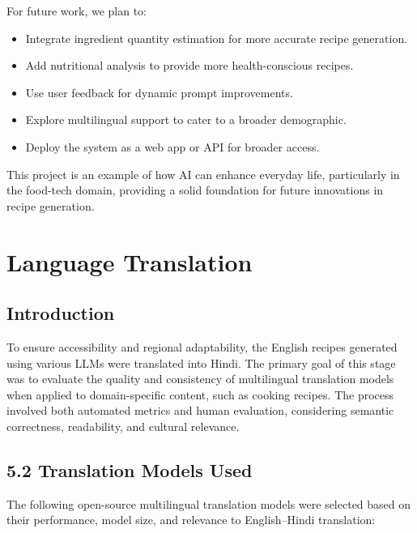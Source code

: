 \documentclass[letterpaper,11pt]{report}
\begin{document}
For future work, we plan to:
\begin{itemize}
    \item Integrate ingredient quantity estimation for more accurate recipe generation.
    \item Add nutritional analysis to provide more health-conscious recipes.
    \item Use user feedback for dynamic prompt improvements.
    \item Explore multilingual support to cater to a broader demographic.
    \item Deploy the system as a web app or API for broader access.
\end{itemize}

This project is an example of how AI can enhance everyday life, particularly in the food-tech domain, providing a solid foundation for future innovations in recipe generation.


\chapter{Language Translation}
\section{Introduction}
To ensure accessibility and regional adaptability, the English recipes generated using various LLMs were translated into Hindi. The primary goal of this stage was to evaluate the quality and consistency of multilingual translation models when applied to domain-specific content, such as cooking recipes. The process involved both automated metrics and human evaluation, considering semantic correctness, readability, and cultural relevance.

\section{5.2 Translation Models Used}

The following open-source multilingual translation models were selected based on their performance, model size, and relevance to English–Hindi translation:
\end{document}
